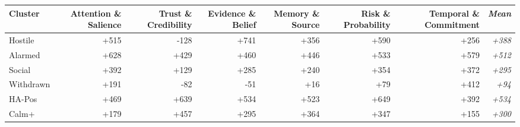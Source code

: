 {\renewcommand{\tabcolsep}{10pt}
\begin{tabular}{lrrrrrrr}
\toprule
Cluster & Attention \& Salience & Trust \& Credibility & Evidence \& Belief & Memory \& Source & Risk \& Probability & Temporal \& Commitment & \textit{Mean} \\
\midrule
Hostile & +515 & -128 & +741 & +356 & +590 & +256 & \textit{+388} \\
Alarmed & +628 & +429 & +460 & +446 & +533 & +579 & \textit{+512} \\
Social & +392 & +129 & +285 & +240 & +354 & +372 & \textit{+295} \\
Withdrawn & +191 & -82 & -51 & +16 & +79 & +412 & \textit{+94} \\
HA-Pos & +469 & +639 & +534 & +523 & +649 & +392 & \textit{+534} \\
Calm+ & +179 & +457 & +295 & +364 & +347 & +155 & \textit{+300} \\
\bottomrule
\end{tabular}
}
